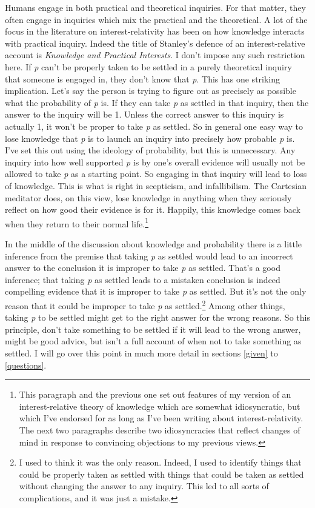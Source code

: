 \documentclass[
  11pt,
]{book}
\begin{document}
Humans engage in both practical and theoretical inquiries. For that matter, they often engage in inquiries which mix the practical and the theoretical. A lot of the focus in the literature on interest-relativity has been on how knowledge interacts with practical inquiry. Indeed the title of Stanley's defence of an interest-relative account is \emph{Knowledge and Practical Interests}. I don't impose any such restriction here. If \emph{p} can't be properly taken to be settled in a purely theoretical inquiry that someone is engaged in, they don't know that \emph{p}. This has one striking implication. Let's say the person is trying to figure out as precisely as possible what the probability of \emph{p} is. If they can take \emph{p} as settled in that inquiry, then the answer to the inquiry will be 1. Unless the correct answer to this inquiry is actually 1, it won't be proper to take \emph{p} as settled. So in general one easy way to lose knowledge that \emph{p} is to launch an inquiry into precisely how probable \emph{p} is. I've set this out using the ideology of probability, but this is unnecessary. Any inquiry into how well supported \emph{p} is by one's overall evidence will usually not be allowed to take \emph{p} as a starting point. So engaging in that inquiry will lead to loss of knowledge. This is what is right in scepticism, and infallibilism. The Cartesian meditator does, on this view, lose knowledge in anything when they seriously reflect on how good their evidence is for it. Happily, this knowledge comes back when they return to their normal life.\footnote{This paragraph and the previous one set out features of my version of an interest-relative theory of knowledge which are somewhat idiosyncratic, but which I've endorsed for as long as I've been writing about interest-relativity. The next two paragraphs describe two idiosyncracies that reflect changes of mind in response to convincing objections to my previous views.}

In the middle of the discussion about knowledge and probability there is a little inference from the premise that taking \emph{p} as settled would lead to an incorrect answer to the conclusion it is improper to take \emph{p} as settled. That's a good inference; that taking \emph{p} as settled leads to a mistaken conclusion is indeed compelling evidence that it is improper to take \emph{p} as settled. But it's not the only reason that it could be improper to take \emph{p} as settled.\footnote{I used to think it was the only reason. Indeed, I used to identify things that could be properly taken as settled with things that could be taken as settled without changing the answer to any inquiry. This led to all sorts of complications, and it was just a mistake.} Among other things, taking \emph{p} to be settled might get to the right answer for the wrong reasons. So this principle, don't take something to be settled if it will lead to the wrong answer, might be good advice, but isn't a full account of when not to take something as settled. I will go over this point in much more detail in sections \ref{given} to \ref{questions}.
\end{document}
